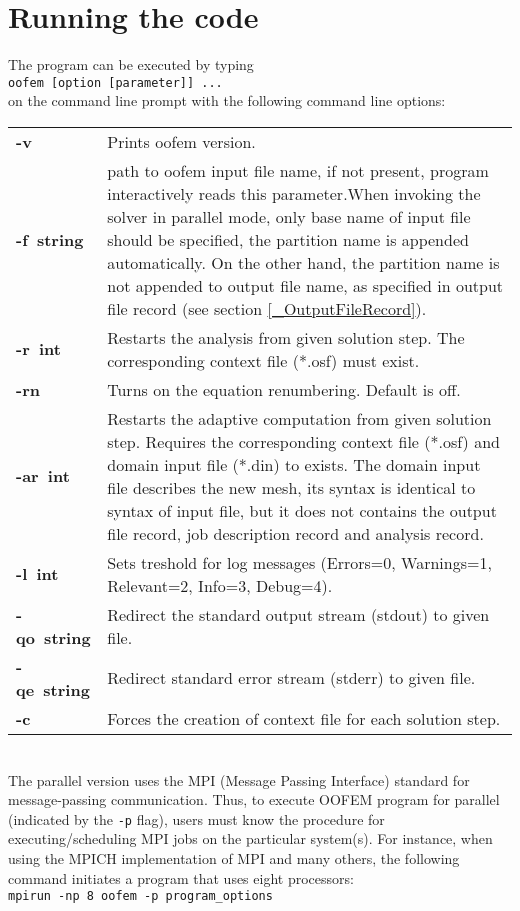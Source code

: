 \documentclass[a4paper]{report}
\newcommand{\Pmode}[1]{{\sffamily #1}}
\begin{document}
\section{Running the code}
\label{_running_the_code}
The program can be executed by typing\\
\texttt{oofem [option [parameter]] ...}\\
on the command line prompt with the following command line options:\\[1em]
\begin{tabularx}{\textwidth}{l|X}
\hline
\textbf{\mbox{-v}} & Prints oofem version.\\
\textbf{\mbox{-f~string}} & path to oofem input file name, if not present, program interactively
reads this parameter.\Pmode{When invoking the solver in parallel mode, only base name of input file should be specified, 
the partition name is appended automatically. On the other hand, the partition name is not appended to output file name, as specified
in output file record (see section \ref{_OutputFileRecord}).}\\
\textbf{\mbox{-r~int}} & Restarts the analysis from given solution step. The corresponding
context file (*.osf) must exist.\\
\textbf{\mbox{-rn}} & Turns on the equation renumbering. Default is off.\\
\textbf{\mbox{-ar~int}} & 
Restarts the adaptive computation from given solution step.
Requires the corresponding context file (*.osf) and domain input file
(*.din) to exists. The domain input file describes the new mesh, its
syntax is identical to syntax of input file, but it does not contains
the output file record, job description record and analysis record.\\
\textbf{\mbox{-l~int}} & Sets treshold for log messages (Errors=0, Warnings=1,
Relevant=2, Info=3, Debug=4).\\
\textbf{\mbox{-qo~string}} & Redirect the standard output stream (stdout) to given file.\\
\textbf{\mbox{-qe~string}} & Redirect standard error stream (stderr) to given file.\\
\textbf{\mbox{-c}} & Forces the creation of context file for each solution step.\\
\hline
\end{tabularx}\\[1em]

\Pmode{
The parallel version uses the MPI (Message Passing Interface) standard for message-passing communication. Thus, to execute OOFEM program for parallel (indicated by the \texttt{-p} flag),
users must know the procedure for executing/scheduling MPI jobs on the particular system(s).
For instance, when using the MPICH implementation of MPI and many others, the following command initiates a program that uses eight processors: \\[2mm]
\texttt{mpirun -np 8 oofem -p program\_options}
}
\end{document}
